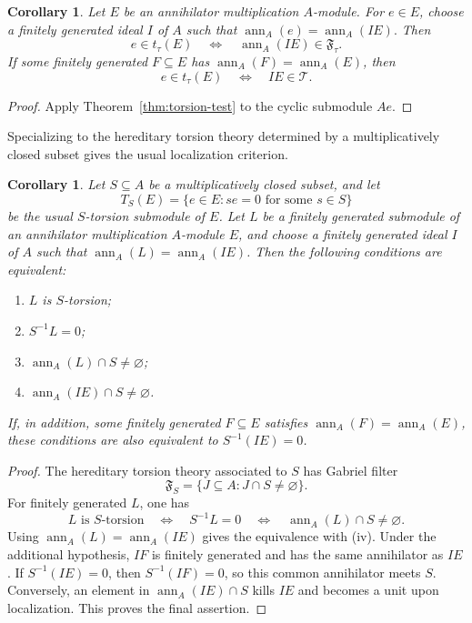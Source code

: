 \documentclass[11pt]{amsart}
\theoremstyle{plain}
\newtheorem{corollary}[theorem]{Corollary}
\theoremstyle{definition}
\theoremstyle{remark}
\newcommand{\ann}{\operatorname{ann}}
\numberwithin{equation}{section}
\begin{document}
\begin{corollary}
\label{cor:elementwise-torsion}
Let $E$ be an annihilator multiplication $A$-module. For $e\in E$, choose a
finitely generated ideal $I$ of $A$ such that $\ann_A(e)=\ann_A(IE).$
Then
\[
e\in t_\tau(E) \quad\iff\quad \ann_A(IE)\in\mathfrak F_\tau.
\]
If some finitely generated $F\subseteq E$ has
$\ann_A(F)=\ann_A(E)$, then
\[
e\in t_\tau(E) \quad\iff\quad IE\in\mathcal T.
\]
\end{corollary}

\begin{proof}
Apply Theorem~\ref{thm:torsion-test} to the cyclic submodule $Ae$.
\end{proof}

Specializing to the hereditary torsion theory determined by a multiplicatively
closed subset gives the usual localization criterion.

\begin{corollary}
\label{cor:s-torsion}
Let $S\subseteq A$ be a multiplicatively closed subset, and let
\[
T_S(E)=\{e\in E:se=0\text{ for some }s\in S\}
\]
be the usual $S$-torsion submodule of $E$. Let $L$ be a finitely generated
submodule of an annihilator multiplication $A$-module $E$, and choose a finitely
generated ideal $I$ of $A$ such that $\ann_A(L)=\ann_A(IE)$. Then the following
conditions are equivalent:
\begin{enumerate}[label=\textup{(\roman*)}]
  \item $L$ is $S$-torsion;
  \item $S^{-1}L=0$;
  \item $\ann_A(L)\cap S\neq\varnothing$;
  \item $\ann_A(IE)\cap S\neq\varnothing$.
\end{enumerate}
If, in addition, some finitely generated $F\subseteq E$ satisfies
$\ann_A(F)=\ann_A(E)$, these conditions are also equivalent to
$S^{-1}(IE)=0$.
\end{corollary}

\begin{proof}
The hereditary torsion theory associated to $S$ has Gabriel filter
\[
    \mathfrak F_S=\{J\subseteq A:J\cap S\neq\varnothing\}.
\]
For finitely generated $L$, one has
\[
L\text{ is }S\text{-torsion} \quad\iff\quad S^{-1}L=0 \quad\iff\quad \ann_A(L)\cap S\neq\varnothing.
\]
Using $\ann_A(L)=\ann_A(IE)$ gives the equivalence with (iv).
Under the additional hypothesis, $IF$ is finitely generated and has
the same annihilator as $IE$. If $S^{-1}(IE)=0$, then
$S^{-1}(IF)=0$, so this common annihilator meets $S$.
Conversely, an element in $\ann_A(IE)\cap S$ kills $IE$ and becomes
a unit upon localization. This proves the final assertion.
\end{proof}
\end{document}
